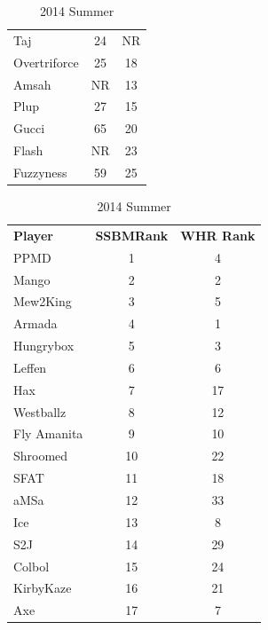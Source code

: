 \documentclass[10pt]{article}
\theoremstyle{definition}
\theoremstyle{remark}
\begin{document}
\begin{table}[!ht]
{\begin{tabular}{lcc}
    Taj             & 24                     & NR       \\
    Overtriforce    & 25                     & 18       \\
    Amsah           & NR                     & 13       \\
    Plup            & 27                     & 15       \\
    Gucci           & 65                     & 20       \\
    Flash           & NR                     & 23       \\
    Fuzzyness       & 59                     & 25       \\
\end{tabular}
}
    \parbox{.35 \textwidth}{
        \centering
        \caption{2014 Summer}
\begin{tabular}{lcc}
    \textbf{Player} & \textbf{SSBMRank} & \textbf{WHR Rank} \\
    PPMD            & 1                      & 4        \\
    Mango           & 2                      & 2        \\
    Mew2King        & 3                      & 5        \\
    Armada          & 4                      & 1        \\
    Hungrybox       & 5                      & 3        \\
    Leffen          & 6                      & 6        \\
    Hax             & 7                      & 17       \\
    Westballz       & 8                      & 12       \\
    Fly Amanita     & 9                      & 10       \\
    Shroomed        & 10                     & 22       \\
    SFAT            & 11                     & 18       \\
    aMSa            & 12                     & 33       \\
    Ice             & 13                     & 8        \\
    S2J             & 14                     & 29       \\
    Colbol          & 15                     & 24       \\
    KirbyKaze       & 16                     & 21       \\
    Axe             & 17                     & 7        \\

\end{tabular}}
\end{table}
\end{document}
